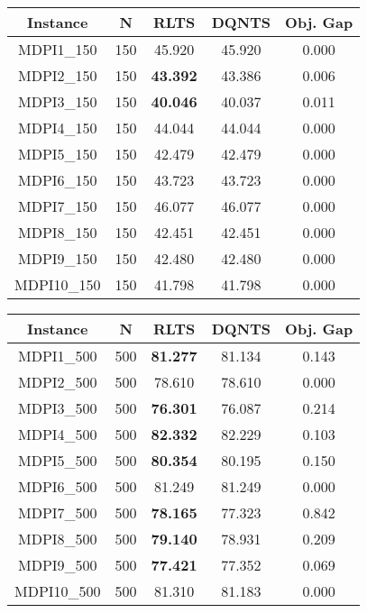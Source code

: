 \begin{center}
  \begin{tabular}{ c|c|c|c|c }
    \hline
    \textbf{Instance} & \textbf{N} & \textbf{RLTS} & \textbf{DQNTS} & \textbf{Obj. Gap} \\ \hline
    MDPI1\_150 & 150 & 45.920 & 45.920 & 0.000 \\ \hline
    MDPI2\_150 & 150 & \textbf{43.392} & 43.386 & 0.006 \\ \hline
    MDPI3\_150 & 150 & \textbf{40.046} & 40.037 & 0.011 \\ \hline
    MDPI4\_150 & 150 & 44.044 & 44.044 & 0.000 \\ \hline
    MDPI5\_150 & 150 & 42.479 & 42.479 & 0.000 \\ \hline
    MDPI6\_150 & 150 & 43.723 & 43.723 & 0.000 \\ \hline
    MDPI7\_150 & 150 & 46.077 & 46.077 & 0.000 \\ \hline
    MDPI8\_150 & 150 & 42.451 & 42.451 & 0.000 \\ \hline
    MDPI9\_150 & 150 & 42.480 & 42.480 & 0.000 \\ \hline
    MDPI10\_150 & 150 & 41.798 & 41.798 & 0.000 \\ \hline
  \end{tabular}
  \bigskip
  \begin{tabular}{ c|c|c|c|c }
    \hline
    \textbf{Instance} & \textbf{N} & \textbf{RLTS} & \textbf{DQNTS} & \textbf{Obj. Gap} \\ \hline
    MDPI1\_500 & 500 & \textbf{81.277} & 81.134 & 0.143 \\ \hline
    MDPI2\_500 & 500 & 78.610 & 78.610 & 0.000 \\ \hline
    MDPI3\_500 & 500 & \textbf{76.301} & 76.087 & 0.214 \\ \hline
    MDPI4\_500 & 500 & \textbf{82.332} & 82.229 & 0.103 \\ \hline
    MDPI5\_500 & 500 & \textbf{80.354} & 80.195 & 0.150 \\ \hline
    MDPI6\_500 & 500 & 81.249 & 81.249 & 0.000 \\ \hline
    MDPI7\_500 & 500 & \textbf{78.165} & 77.323 & 0.842 \\ \hline
    MDPI8\_500 & 500 & \textbf{79.140} & 78.931 & 0.209 \\ \hline
    MDPI9\_500 & 500 & \textbf{77.421} & 77.352 & 0.069 \\ \hline
    MDPI10\_500 & 500 & 81.310 & 81.183 & 0.000 \\ \hline
  \end{tabular}

\end{center}
